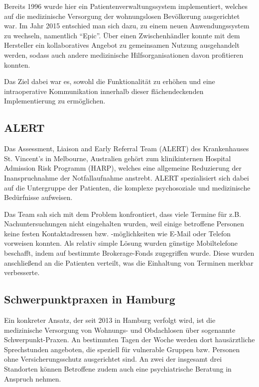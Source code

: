 Bereits 1996 wurde hier ein Patientenverwaltungssystem implementiert, welches auf die medizinische Versorgung der wohnungslosen Bevölkerung ausgerichtet war. Im Jahr 2015 entschied man sich dazu, zu einem neuen Anwendungssystem zu wechseln, namentlich \enquote{Epic}. Über einen Zwischenhändler konnte mit dem Hersteller ein kollaboratives Angebot zu gemeinsamen Nutzung ausgehandelt werden, sodass auch andere medizinische Hilfsorganisationen davon profitieren konnten.

Das Ziel dabei war es, sowohl die Funktionalität zu erhöhen und eine intraoperative Kommunikation innerhalb dieser flächendeckenden Implementierung zu ermöglichen. \citep{Angoff.2019}

\newpage
\subsection{ALERT}

Das Assessment, Liaison and Early Referral Team (ALERT) des Krankenhauses St. Vincent's in Melbourne, Australien gehört zum klinikinternen Hospital Admission Risk Programm (HARP), welches eine allgemeine Reduzierung der Inanspruchnahme der Notfallaufnahme anstrebt. ALERT spezialisiert sich dabei auf die Untergruppe der Patienten, die komplexe psychosoziale und medizinische Bedürfnisse aufweisen.

Das Team sah sich mit dem Problem konfrontiert, dass viele Termine für z.B. Nachuntersuchungen nicht eingehalten wurden, weil einige betroffene Personen keine festen Kontaktadressen bzw. -möglichkeiten wie E-Mail oder Telefon vorweisen konnten. Als relativ simple Lösung wurden günstige Mobiltelefone beschafft, indem auf bestimmte Brokerage-Fonds zugegriffen wurde. Diese wurden anschließend an die Patienten verteilt, was die Einhaltung von Terminen merkbar verbesserte. \citep{Davies.2018}

\subsection{Schwerpunktpraxen in Hamburg}

Ein konkreter Ansatz, der seit 2013 in Hamburg verfolgt wird, ist die medizinische Versorgung von Wohnungs- und Obdachlosen über sogenannte Schwerpunkt-Praxen. An bestimmten Tagen der Woche werden dort hausärztliche Sprechstunden angeboten, die speziell für vulnerable Gruppen bzw. Personen ohne Versicherungsschutz ausgerichtet sind. An zwei der insgesamt drei Standorten können Betroffene zudem auch eine psychiatrische Beratung in Anspruch nehmen.

